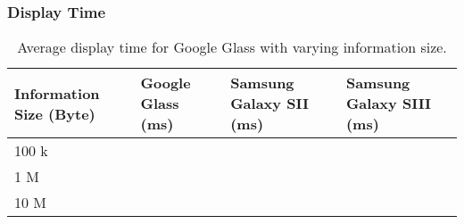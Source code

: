 \subsubsection{Display Time}

	\begin{table}[ht!]
    		\caption{Average display time for Google Glass with varying information size.} \label{tab:averageDisplaySpeedGoogleGlass}
		\centering \begin{tabularx}{\textwidth}{l|X|X|X} \hline
		\textbf{Information Size (Byte)} & \textbf{Google Glass (ms)}  & \textbf{Samsung Galaxy SII (ms)}  & \textbf{Samsung Galaxy SIII (ms)} \\ \hline \hline
       
		100 k	&	&	&	 \\ \hline
		1 M		&	&	&	 \\ \hline
		10 M		&	&	&	 \\ \hline

		\end{tabularx}
	\end{table}